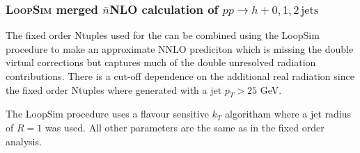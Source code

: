 \subsubsection{\textsc{LoopSim} merged $\bar{n}$NLO calculation of $pp\to h+0,1,2\,\text{jets}$}
\label{sec:hjetscomp:tools:fo:hnjloopsim}

The fixed order Ntuples used for the can be combined using the LoopSim procedure to make
an approximate NNLO prediciton which is missing the double virtual corrections but captures
much of the double unresolved radiation contributions. There is a cut-off dependence on the
additional real radiation since the fixed order Ntuples where generated with a jet $p_T>25$ GeV.

The LoopSim procedure uses a flavour sensitive $k_T$ algoritham where a jet radius of $R=1$ was used.
All other parameters are the same as in the fixed order analysis.
